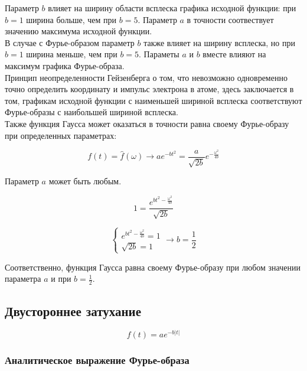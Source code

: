 \documentclass[a5paper, 10pt]{article}
\theoremstyle{definition}
\theoremstyle{plain}
\theoremstyle{remark}
\begin{document}
Параметр $b$ влияет на ширину области всплеска графика исходной функции: при $b=1$ ширина больше, чем при $b=5$. Параметр $a$ в точности соотвествует значению максимума исходной функции.\\

В случае с Фурье-образом параметр $b$ также влияет на ширину всплеска, но при $b=1$ ширина меньше, чем при $b=5$. Параметы $a$ и $b$ вместе влияют на максимум графика Фурье-образа.\\

Принцип неопределенности Гейзенберга о том, что невозможно одновременно точно определить координату и импульс электрона в атоме, здесь заключается в том, графикам исходной функции с наименьшей шириной всплеска соответствуют Фурье-образы с наибольшей шириной всплеска.\\

Также функция Гаусса может оказаться в точности равна своему Фурье-образу при определенных параметрах:

\begin{equation}
f(t) = \hat{f}(\omega)  \to a e^{-bt^2}  =  \frac{a}{\sqrt{2b}} e^{-\frac{\omega^2}{4b}}
\end{equation}

Параметр $a$ может быть любым.

\begin{equation}
 1  =  \frac{ e^{bt^2 -\frac{\omega^2}{4b}}}{\sqrt{2b}}
\end{equation}



\begin{equation}
\begin{cases}
 e^{bt^2 -\frac{\omega^2}{4b}} = 1\\
\sqrt{2b} = 1
\end{cases}
\to b = \frac{1}{2}
\end{equation}

Соответственно, функция Гаусса равна своему Фурье-образу при любом значении параметра $a$ и при $b=\frac{1}{2}$.


\newpage
\subsection{Двустороннее затухание}

\begin{equation}
f(t) =  a e^{-b|t|} 
\end{equation}


\subsubsection{Аналитическое выражение Фурье-образа}
\end{document}

